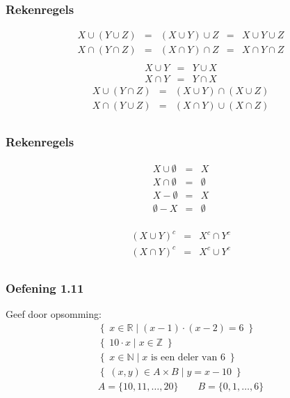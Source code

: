 \documentclass[dutch]{../khlslides}
\newcommand{\union}{\cup}
\newcommand{\intersect}{\cap}
\begin{document}
\begin{frame}
  \frametitle{Rekenregels}
  \[
    \begin{array}{rclclr}
      X \union (Y \union Z) & = & (X \union Y) \union Z & = & X \union Y \union Z \\
      X \intersect (Y \intersect Z) & = & (X \intersect Y) \intersect Z & = & X \intersect Y \intersect Z \\
    \end{array}
  \]
  \[
    \begin{array}{rcl}
      X \union Y & = & Y \union X \\
      X \intersect Y & = & Y \intersect X
    \end{array}
  \]
  \[
    \begin{array}{rcl}
      X \union (Y \intersect Z) & = & (X \union Y) \intersect (X \union Z) \\
      X \intersect (Y \union Z) & = & (X \intersect Y) \union (X \intersect Z) \\
    \end{array}
  \]
\end{frame}

\begin{frame}
  \frametitle{Rekenregels}
  \[
    \begin{array}{rclclr}
      X \union \emptyset & = & X \\
      X \intersect \emptyset & = & \emptyset \\
      X - \emptyset & = & X \\
      \emptyset - X & = & \emptyset \\
    \end{array}
  \]

  \[
    \begin{array}{rclclr}
      (X \union Y)^c & = & X^c \intersect Y^c \\
      (X \intersect Y)^c & = & X^c \union Y^c \\
    \end{array}
  \]
\end{frame}

\begin{frame}
  \frametitle{Oefening 1.11}
  Geef door opsomming:
  \[
    \begin{array}{c}
      \left\{ \; x \in \mathbb{R} \;|\; (x-1) \cdot (x-2) = 6 \; \right\} \\[1cm]
      \left\{ \; 10\cdot x \;|\; x \in \mathbb{Z} \; \right\} \\[1cm]
      \left\{ \; x \in \mathbb{N} \;|\; x \textrm{ is een deler van 6} \; \right\} \\[1cm]
      \left\{ \; (x, y) \in A \times B \;|\; y = x - 10 \; \right\} \\ A = \{10,11,\dots,20\} \qquad B = \{0,1,\dots,6\}
    \end{array}
  \]
\end{frame}
\end{document}
